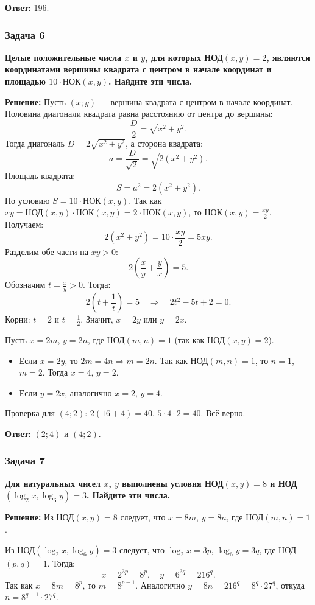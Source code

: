 \documentclass[12pt, a4paper]{article}
\begin{document}
\textbf{Ответ:} 196.

\subsubsection*{Задача 6}
\textbf{Целые положительные числа $x$ и $y$, для которых НОД$(x,y) = 2$, являются координатами вершины квадрата с центром в начале координат и площадью $10 \cdot \text{НОК}(x,y)$. Найдите эти числа.}

\textbf{Решение:}
Пусть $(x; y)$ — вершина квадрата с центром в начале координат. Половина диагонали квадрата равна расстоянию от центра до вершины:
\[
\frac{D}{2} = \sqrt{x^2 + y^2}.
\]
Тогда диагональ $D = 2\sqrt{x^2 + y^2}$, а сторона квадрата:
\[
a = \frac{D}{\sqrt{2}} = \sqrt{2(x^2 + y^2)}.
\]
Площадь квадрата:
\[
S = a^2 = 2(x^2 + y^2).
\]
По условию $S = 10 \cdot \text{НОК}(x, y)$. Так как $xy = \text{НОД}(x,y) \cdot \text{НОК}(x,y) = 2 \cdot \text{НОК}(x,y)$, то $\text{НОК}(x,y) = \frac{xy}{2}$. Получаем:
\[
2(x^2 + y^2) = 10 \cdot \frac{xy}{2} = 5xy.
\]
Разделим обе части на $xy > 0$:
\[
2\left(\frac{x}{y} + \frac{y}{x}\right) = 5.
\]
Обозначим $t = \frac{x}{y} > 0$. Тогда:
\[
2\left(t + \frac{1}{t}\right) = 5 \quad\Rightarrow\quad 2t^2 - 5t + 2 = 0.
\]
Корни: $t = 2$ и $t = \frac{1}{2}$. Значит, $x = 2y$ или $y = 2x$.

Пусть $x = 2m$, $y = 2n$, где $\text{НОД}(m, n) = 1$ (так как $\text{НОД}(x, y) = 2$).

\begin{itemize}
    \item Если $x = 2y$, то $2m = 4n \Rightarrow m = 2n$. Так как $\text{НОД}(m, n) = 1$, то $n = 1$, $m = 2$. Тогда $x = 4$, $y = 2$.
    \item Если $y = 2x$, аналогично $x = 2$, $y = 4$.
\end{itemize}

Проверка для $(4; 2)$: $2(16+4) = 40$, $5 \cdot 4 \cdot 2 = 40$. Всё верно.

\textbf{Ответ:} $(2; 4)$ и $(4; 2)$.

\subsubsection*{Задача 7}
\textbf{Для натуральных чисел $x$, $y$ выполнены условия НОД$(x,y)=8$ и НОД$(\log_2 x, \log_6 y) = 3$. Найдите эти числа.}

\textbf{Решение:}
Из НОД$(x,y)=8$ следует, что $x = 8m$, $y = 8n$, где НОД$(m,n)=1$.

Из НОД$(\log_2 x, \log_6 y) = 3$ следует, что $\log_2 x = 3p$, $\log_6 y = 3q$, где НОД$(p,q)=1$. Тогда:
\[
x = 2^{3p} = 8^p, \quad y = 6^{3q} = 216^q.
\]
Так как $x = 8m = 8^p$, то $m = 8^{p-1}$. Аналогично $y = 8n = 216^q = 8^q \cdot 27^q$, откуда $n = 8^{q-1} \cdot 27^q$.
\end{document}
